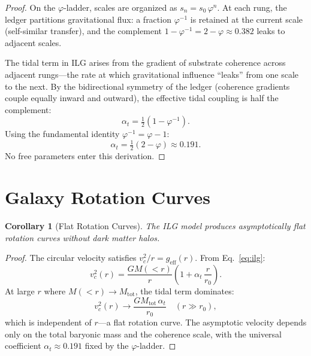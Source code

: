 \documentclass[12pt,a4paper]{article}
\newtheorem{corollary}[theorem]{Corollary}
\theoremstyle{definition}
\theoremstyle{remark}
\begin{document}
\begin{proof}
On the $\varphi$-ladder, scales are organized as
$s_n = s_0\,\varphi^n$.  At each rung, the ledger partitions
gravitational flux: a fraction $\varphi^{-1}$ is retained at
the current scale (self-similar transfer), and the complement
$1 - \varphi^{-1} = 2 - \varphi \approx 0.382$ leaks to
adjacent scales.

The tidal term in ILG arises from the gradient of substrate
coherence across adjacent rungs---the rate at which
gravitational influence ``leaks'' from one scale to the next.
By the bidirectional symmetry of the ledger (coherence
gradients couple equally inward and outward), the effective
tidal coupling is half the complement:
\begin{equation}
  \alpha_t = \tfrac{1}{2}(1 - \varphi^{-1}).
\end{equation}
Using the fundamental identity
$\varphi^{-1} = \varphi - 1$:
\begin{equation}
  \alpha_t = \tfrac{1}{2}(2 - \varphi) \approx 0.191.
\end{equation}
No free parameters enter this derivation.
\end{proof}

\section{Galaxy Rotation Curves}
\label{sec:rotation}

\begin{corollary}[Flat Rotation Curves]
\label{thm:flat}
The ILG model produces asymptotically flat rotation curves
without dark matter halos.
\end{corollary}

\begin{proof}
The circular velocity satisfies
$v_c^2 / r = g_{\mathrm{eff}}(r)$.  From
Eq.~\eqref{eq:ilg}:
\begin{equation}
  v_c^2(r) = \frac{GM(<r)}{r}
  \left(1 + \alpha_t\,\frac{r}{r_0}\right).
  \label{eq:vc}
\end{equation}
At large $r$ where $M(<r) \to M_{\mathrm{tot}}$, the tidal
term dominates:
\begin{equation}
  v_c^2(r) \to
  \frac{GM_{\mathrm{tot}}\,\alpha_t}{r_0}
  \quad (r \gg r_0),
\end{equation}
which is independent of $r$---a flat rotation curve.  The
asymptotic velocity depends only on the total baryonic mass
and the coherence scale, with the universal coefficient
$\alpha_t \approx 0.191$ fixed by the $\varphi$-ladder.
\end{proof}
\end{document}

